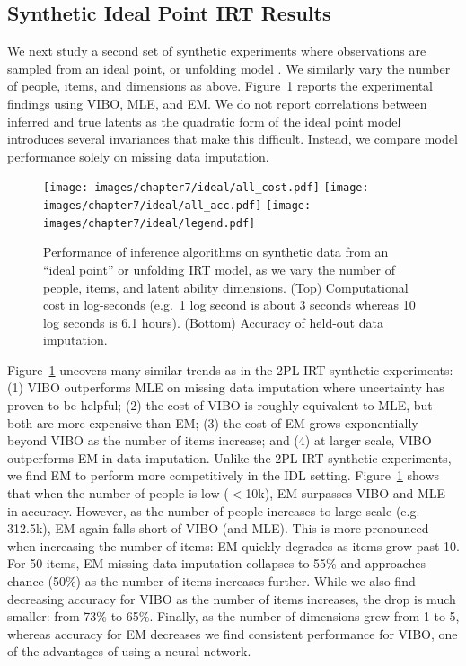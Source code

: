 \subsection{Synthetic Ideal Point IRT Results}

We next study a second set of synthetic experiments where observations are sampled from an ideal point, or unfolding model \cite{maydeu2006multidimensional}. 
We similarly vary the number of people, items, and dimensions as above. Figure~\ref{fig:synth_ideal_results} reports the experimental findings using VIBO, MLE, and EM. 
We do not report correlations between inferred and true latents as the quadratic form of the ideal point model introduces several invariances that make this difficult.
Instead, we compare model performance solely on missing data imputation.

\begin{figure}
    \centering
    \texttt{[image: images/chapter7/ideal/all\_cost.pdf]}
    \texttt{[image: images/chapter7/ideal/all\_acc.pdf]}
    \texttt{[image: images/chapter7/ideal/legend.pdf]}
    \caption{Performance of inference algorithms on synthetic data from an ``ideal point'' or unfolding IRT model, as we vary the number of people, items, and latent ability dimensions. (Top) Computational cost in log-seconds (e.g.~1 log second is about 3 seconds whereas 10 log seconds is 6.1 hours). (Bottom) Accuracy of held-out data imputation.}
    \label{fig:synth_ideal_results}
\end{figure}

Figure~\ref{fig:synth_ideal_results} uncovers many similar trends as in the 2PL-IRT synthetic experiments: (1) VIBO outperforms MLE on missing data imputation where uncertainty has proven to be helpful; (2) the cost of VIBO is roughly equivalent to MLE, but both are more expensive than EM; (3) the cost of EM grows exponentially beyond VIBO as the number of items increase; and (4) at larger scale, VIBO outperforms EM in data imputation. 
Unlike the 2PL-IRT synthetic experiments, we find EM to perform more competitively in the IDL setting. 
Figure~\ref{fig:synth_ideal_results} shows that when the number of people is low ($<$10k), EM surpasses VIBO and MLE in accuracy. 
However, as the number of people increases to large scale (e.g. 312.5k), EM again falls short of VIBO (and MLE). 
This is more pronounced when increasing the number of items: EM quickly degrades as items grow past 10. 
For 50 items, EM missing data imputation collapses to 55\% and approaches chance (50\%) as the number of items increases further.
While we also find decreasing accuracy for VIBO as the number of items increases, the drop is much smaller: from 73\% to 65\%.
Finally, as the number of dimensions grew from 1 to 5, whereas accuracy for EM decreases we find consistent performance for VIBO, one of the advantages of using a neural network.

